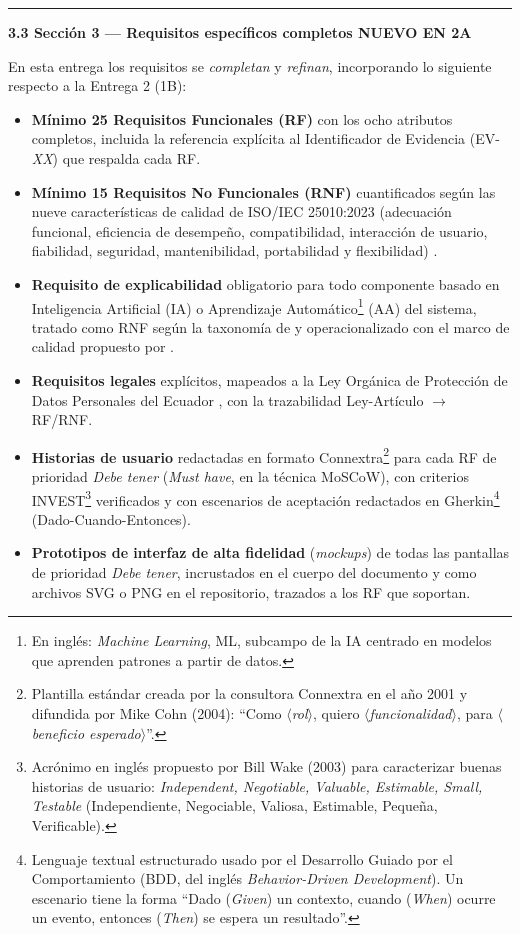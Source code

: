\documentclass[11pt,a4paper]{article}
\newcommand{\submark}[1]{\par\vspace{4pt}\noindent
    {\color{uteqgreen}\rule[-1pt]{3.5pt}{12pt}}\hspace{6pt}\textbf{\color{uteqgreen}#1}\par\vspace{2pt}}
\newcommand{\bA}{{\setlength{\fboxsep}{1.5pt}\colorbox{teal1}{\scriptsize\bfseries\color{white}NUEVO EN 2A}}}
\begin{document}
\submark{3.3 Sección 3 --- Requisitos específicos completos \bA}
En esta entrega los requisitos se \emph{completan} y \emph{refinan}, incorporando lo siguiente respecto a la Entrega 2 (1B):
\begin{itemize}
    \item \textbf{Mínimo 25 Requisitos Funcionales (RF)} con los ocho atributos completos, incluida la referencia explícita al Identificador de Evidencia (EV-\emph{XX}) que respalda cada RF.
    \item \textbf{Mínimo 15 Requisitos No Funcionales (RNF)} cuantificados según las nueve características de calidad de ISO/IEC 25010:2023 (adecuación funcional, eficiencia de desempeño, compatibilidad, interacción de usuario, fiabilidad, seguridad, mantenibilidad, portabilidad y flexibilidad) \cite{iso25010_2023}.
    \item \textbf{Requisito de explicabilidad} obligatorio para todo componente basado en Inteligencia Artificial (IA) o Aprendizaje Automático\footnote{En inglés: \emph{Machine Learning}, ML, subcampo de la IA centrado en modelos que aprenden patrones a partir de datos.} (AA) del sistema, tratado como RNF según la taxonomía de \cite{chazette2020nfr} y operacionalizado con el marco de calidad propuesto por \cite{chazette2021exploring,chazette2022explainable}.
    \item \textbf{Requisitos legales} explícitos, mapeados a la Ley Orgánica de Protección de Datos Personales del Ecuador \cite{ley_datos_ecuador_2021}, con la trazabilidad Ley-Artículo $\rightarrow$ RF/RNF.
    \item \textbf{Historias de usuario} redactadas en formato Connextra\footnote{Plantilla estándar creada por la consultora Connextra en el año 2001 y difundida por Mike Cohn (2004): ``Como \emph{$\langle$rol$\rangle$}, quiero \emph{$\langle$funcionalidad$\rangle$}, para \emph{$\langle$beneficio esperado$\rangle$}''.} para cada RF de prioridad \emph{Debe tener} (\emph{Must have}, en la técnica MoSCoW), con criterios INVEST\footnote{Acrónimo en inglés propuesto por Bill Wake (2003) para caracterizar buenas historias de usuario: \emph{Independent, Negotiable, Valuable, Estimable, Small, Testable} (Independiente, Negociable, Valiosa, Estimable, Pequeña, Verificable).} verificados y con escenarios de aceptación redactados en Gherkin\footnote{Lenguaje textual estructurado usado por el Desarrollo Guiado por el Comportamiento (BDD, del inglés \emph{Behavior-Driven Development}). Un escenario tiene la forma ``Dado (\emph{Given}) un contexto, cuando (\emph{When}) ocurre un evento, entonces (\emph{Then}) se espera un resultado''.} (Dado-Cuando-Entonces).
    \item \textbf{Prototipos de interfaz de alta fidelidad} (\emph{mockups}) de todas las pantallas de prioridad \emph{Debe tener}, incrustados en el cuerpo del documento y como archivos SVG o PNG en el repositorio, trazados a los RF que soportan.
\end{itemize}
\end{document}
